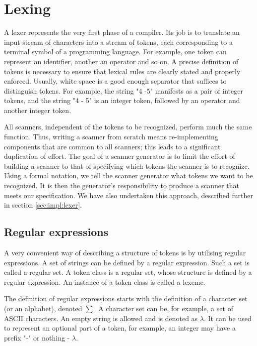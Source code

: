 \section{Lexing}
\label{background:lexing}

A lexer represents the very first phase of a compiler. Its job is to translate an input stream of characters into a stream of tokens, each corresponding to a terminal symbol of a programming language. \cite[p.57]{craftingCompiler} For example, one token can represent an identifier, another an operator and so on. A precise definition of tokens is necessary to ensure that lexical rules are clearly stated and properly enforced. \cite[p. 58]{craftingCompiler} Usually, white space is a good enough separator that suffices to distinguish tokens. For example, the string "4 -5" manifests as a pair of integer tokens, and the string "4 - 5" is an integer token, followed by an operator and another integer token.  

\par
All scanners, independent of the tokens to be recognized, perform much the same function. Thus, writing a scanner from scratch means re-implementing components that are common to all scanners; this leads to a significant duplication of effort. The goal of a scanner generator is to limit the effort of building a scanner to that of specifying which tokens the scanner is to recognize. Using a formal notation, we tell the scanner generator what tokens we want to be recognized. It is then the generator’s responsibility to produce a scanner that meets our specification. \cite[p. 59]{craftingCompiler} We have also undertaken this approach, described further in section \cref{sec:impl:lexer}.


\subsection{Regular expressions}

\par
A very convenient way of describing a structure of tokens is by utilising regular expressions. A set of strings can be defined by a regular expression. Such a set is called a regular set. A token class is a regular set, whose structure is defined by a regular expression. An instance of a token class is called a lexeme. \cite[p. 60]{craftingCompiler} 

\par
The definition of regular expressions starts with the definition of a character set (or an alphabet), denoted $\sum$. A character set can be, for example, a set of ASCII characters. An empty string is allowed and is denoted as $\lambda$. It can be used to represent an optional part of a token, for example, an integer may have a prefix "-" or nothing - $\lambda$.  \cite[p. 60]{craftingCompiler}

